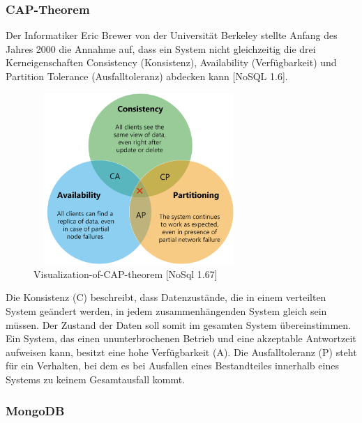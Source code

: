 \subsubsection{CAP-Theorem}
Der Informatiker Eric Brewer von der Universität Berkeley stellte Anfang des Jahres 2000 die Annahme auf, dass ein System nicht gleichzeitig die drei Kerneigenschaften Consistency (Konsistenz), Availability (Verfügbarkeit) und Partition Tolerance (Ausfalltoleranz) abdecken kann [NoSQL 1.6]. 
\newline

\begin{figure}[h]
\centering
\includegraphics[width=8cm, height=6.5cm]{images/Visualization-of-CAP-theorem.png}
\caption{Visualization-of-CAP-theorem [NoSql 1.67]}
\end{figure}

Die Konsistenz (C) beschreibt, dass Datenzustände, die in einem verteilten System geändert  werden, in jedem zusammenhängenden System gleich sein müssen. Der Zustand der Daten soll somit im gesamten System übereinstimmen. Ein System, das einen ununterbrochenen Betrieb und eine akzeptable Antwortzeit aufweisen kann, besitzt eine hohe Verfügbarkeit (A). Die Ausfalltoleranz (P) steht für ein Verhalten, bei dem es bei Ausfallen eines Bestandteiles innerhalb eines Systems  zu keinem Gesamtausfall kommt.

\newpage
\subsubsection{MongoDB}

